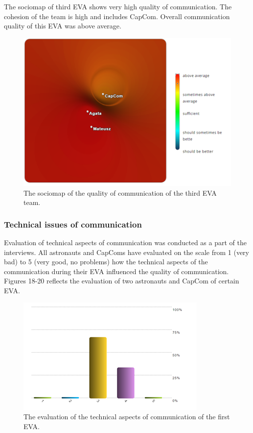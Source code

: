 \documentclass[preprint]{elsarticle}
\begin{document}
The sociomap of third EVA shows very high quality of communication. The cohesion of the team is high and includes CapCom. Overall communication quality of this EVA was above average.

\begin{figure}
\centering
\includegraphics{img/figure17.png}
\caption{The sociomap of the quality of communication of the third EVA team.}
\end{figure}

\subsubsection{Technical issues of communication}
Evaluation of technical aspects of communication was conducted as a part of the interviews. All astronauts and CapComs have evaluated on the scale from 1 (very bad) to 5 (very good, no problems) how the technical aspects of the communication during their EVA influenced the quality of communication. Figures 18-20 reflects the evaluation of two astronauts and CapCom of certain EVA.

\begin{figure}
\centering
\includegraphics{img/figure18.png}
\caption{The evaluation of the technical aspects of communication of the first EVA.}
\end{figure}
\end{document}
